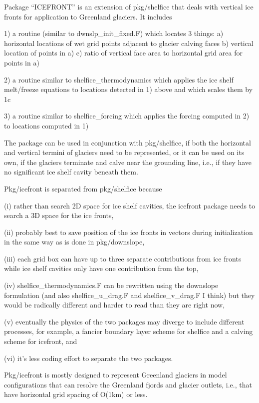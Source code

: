 
Package ``ICEFRONT'' is an extension of pkg/shelfice that deals with vertical
ice fronts for application to Greenland glaciers.  It includes

1) a routine (similar to dwnslp_init_fixed.F) which locates 3 things:
  a) horizontal locations of wet grid points adjacent to glacier calving faces
  b) vertical location of points in a)
  c) ratio of vertical face area to horizontal grid area for points in a)

2) a routine similar to shelfice_thermodynamics which applies the ice shelf
   melt/freeze equations to locations detected in 1) above and which scales
   them by 1c

3) a routine similar to shelfice_forcing which applies the forcing computed
   in 2) to locations computed in 1)

The package can be used in conjunction with pkg/shelfice, if both the
horizontal and vertical termini of glaciers need to be represented, or it can
be used on its own, if the glaciers terminate and calve near the grounding
line, i.e., if they have no significant ice shelf cavity beneath them.

Pkg/icefront is separated from pkg/shelfice because

(i) rather than search 2D space for ice shelf cavities, the icefront package
needs to search a 3D space for the ice fronts,

(ii) probably best to save position of the ice fronts in vectors during
initialization in the same way as is done in pkg/downslope,

(iii) each grid box can have up to three separate contributions from ice
fronts while ice shelf cavities only have one contribution from the top,

(iv) shelfice_thermodynamics.F can be rewritten using the downslope
formulation (and also shelfice_u_drag.F and shelfice_v_drag.F I think) but
they would be radically different and harder to read than they are right now,

(v) eventually the physics of the two packages may diverge to include
different processes, for example, a fancier boundary layer scheme for shelfice
and a calving scheme for icefront, and

(vi) it's less coding effort to separate the two packages.

Pkg/icefront is mostly designed to represent Greenland glaciers in model
configurations that can resolve the Greenland fjords and glacier outlets,
i.e., that have horizontal grid spacing of O(1km) or less.
